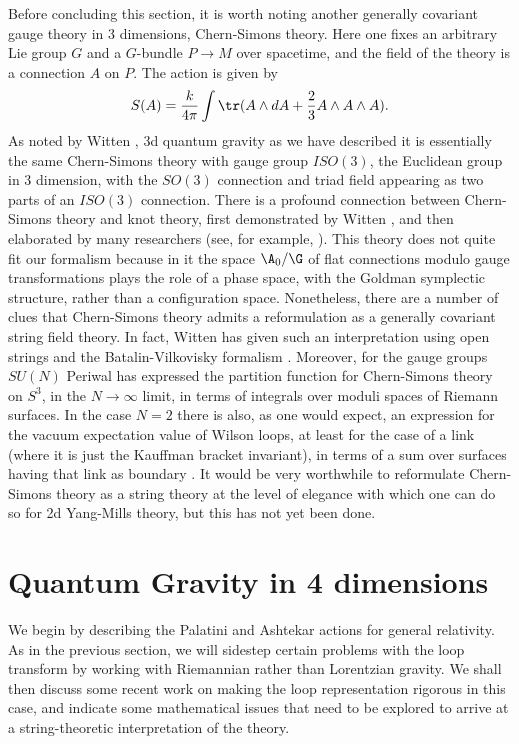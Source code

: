 Before concluding this section,
it is worth noting another generally covariant gauge theory in 3 dimensions,
Chern-Simons theory.  Here one fixes an arbitrary Lie group $G$
and a $G$-bundle $P \to M$ over
spacetime, and the field of the theory
is a connection $A$ on $P$.  The action is given by
\[           S(A) = {k\over 4\pi}
 \int \tr(A \wedge dA + {2\over 3}A \wedge A \wedge A)  .\]
As noted by
Witten \cite{Witten2},  3d quantum gravity as we have described it is
essentially the same Chern-Simons theory with gauge group $ISO(3)$, the
Euclidean group in 3 dimension, with the $SO(3)$ connection and triad field
appearing as two parts of an $ISO(3)$ connection.  There is a profound
connection between Chern-Simons theory and knot theory, first demonstrated
by Witten \cite{Witten}, and then elaborated by many researchers (see, for
example, \cite{Atiyah}).  This theory does not quite fit our formalism
because in it the space $\A_0/\G$ of flat connections modulo gauge
transformations plays the role of a phase space, with the Goldman
symplectic structure, rather than a configuration space.  Nonetheless,
there are a number of clues that Chern-Simons theory admits a reformulation
as a generally covariant string field theory.   In fact, Witten has given
such an interpretation using open strings and the Batalin-Vilkovisky
formalism \cite{Witten3}.  Moreover, for the gauge groups $SU(N)$ Periwal
has expressed the partition function for Chern-Simons theory on $S^3$, in
the $N\to\infty$ limit, in terms of integrals over moduli spaces of Riemann
surfaces.  In the case $N = 2$ there is also, as one would expect, an
expression for the vacuum expectation value of Wilson loops, at least for
the case of a link (where it is just the Kauffman bracket invariant), in
terms of a sum over surfaces having that link as boundary \cite{Carter}.
It would be very worthwhile to reformulate Chern-Simons theory as a string
theory at the level of elegance with which one can do so for 2d Yang-Mills
theory, but this has not yet been done.

\section{Quantum Gravity in 4 dimensions}

We begin by describing the Palatini and Ashtekar actions for general
relativity.    As in the previous section, we will sidestep certain problems
with the loop transform by working with Riemannian rather than Lorentzian
gravity.   We shall then discuss some recent work on making the loop
representation rigorous in this case, and indicate some mathematical issues
that need to be explored to arrive at a string-theoretic interpretation of the
theory.


